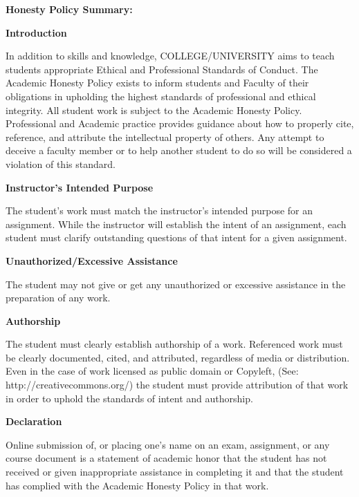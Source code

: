 \documentclass[11pt]{article}
\begin{document}
\textbf {\largeAcademic Honesty Policy Summary:} 

\textbf{Introduction}

\hspace{3mm}
\hangindent=5mm In addition to skills and knowledge, COLLEGE/UNIVERSITY aims to teach students appropriate Ethical and Professional Standards of Conduct. The Academic Honesty Policy exists to inform students and Faculty of their obligations in upholding the highest standards of professional and ethical integrity. All student work is subject to the Academic Honesty Policy. Professional and Academic practice provides guidance about how to properly cite, reference, and attribute the intellectual property of others. Any attempt to deceive a faculty member or to help another student to do so will be considered a violation of this standard.


\textbf{Instructor's Intended Purpose}

\hspace{3mm}
\hangindent=5mm The student's work must match the instructor's intended purpose for an assignment. While the instructor will establish the intent of an assignment, each student must clarify outstanding questions of that intent for a given assignment. 


\textbf{Unauthorized/Excessive Assistance}

\hspace{3mm}
\hangindent=5mm The student may not give or get any unauthorized or excessive assistance in the preparation of any work.

\textbf{Authorship}

\hspace{3mm}
\hangindent=5mm The student must clearly establish authorship of a work. Referenced work must be clearly documented, cited, and attributed, regardless of media or distribution. Even in the case of work licensed as public domain or Copyleft, (See: http://creativecommons.org/) the student must provide attribution of that work in order to uphold the standards of intent and authorship.


\textbf{Declaration}

\hspace{3mm}
\hangindent=5mm Online submission of, or placing one's name on an exam, assignment, or any course document is a statement of academic honor that the student has not received or given inappropriate assistance in completing it and that the student has complied with the Academic Honesty Policy in that work.
\end{document}
